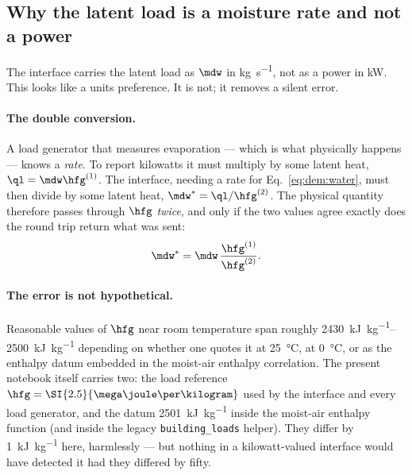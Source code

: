 \subsection{Why the latent load is a moisture rate and not a power}
\label{sec:dem:hfg}

The interface carries the latent load as $\mdw$ in \si{\kilogram\per\second}, not
as a power in \si{\kilo\watt}. This looks like a units preference. It is not; it
removes a silent error.

\paragraph{The double conversion.} A load generator that measures evaporation ---
which is what physically happens --- knows a \emph{rate}. To report kilowatts it
must multiply by some latent heat, $\ql=\mdw\hfg^{(1)}$. The interface, needing a
rate for Eq.~\eqref{eq:dem:water}, must then divide by some latent heat,
$\mdw^{\ast}=\ql/\hfg^{(2)}$. The physical quantity therefore passes through
$\hfg$ \emph{twice}, and only if the two values agree exactly does the round trip
return what was sent:
\begin{equation}
\mdw^{\ast}=\mdw\,\frac{\hfg^{(1)}}{\hfg^{(2)}} .
\label{eq:dem:hfground}
\end{equation}

\paragraph{The error is not hypothetical.} Reasonable values of $\hfg$ near room
temperature span roughly \SIrange{2430}{2500}{\kilo\joule\per\kilogram} depending
on whether one quotes it at \SI{25}{\celsius}, at \SI{0}{\celsius}, or as the
enthalpy datum embedded in the moist-air enthalpy correlation. The present
notebook itself carries two: the load reference
$\hfg=\SI{2.5}{\mega\joule\per\kilogram}$ used by the interface and every load
generator, and the datum \SI{2501}{\kilo\joule\per\kilogram} inside the moist-air
enthalpy function (and inside the legacy \verb|building_loads| helper). They
differ by \SI{1}{\kilo\joule\per\kilogram} here, harmlessly --- but nothing in a
kilowatt-valued interface would have detected it had they differed by fifty.

